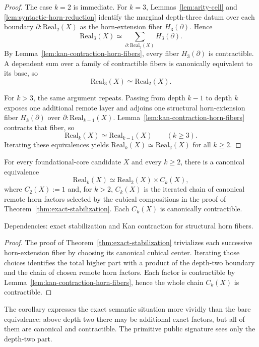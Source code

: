 \documentclass{lmcs}
\begin{document}
\begin{proof}
The case \(k=2\) is immediate.  For \(k=3\), Lemmas~\ref{lem:arity-cell} and
\ref{lem:syntactic-horn-reduction} identify the marginal depth-three datum over each
boundary \(\partial:\mathrm{Real}_2(X)\) as the horn-extension fiber \(H_3(\partial)\).  Hence
\[
  \mathrm{Real}_3(X)
  \simeq
  \sum_{\partial:\mathrm{Real}_2(X)} H_3(\partial).
\]
By Lemma~\ref{lem:kan-contraction-horn-fibers}, every fiber \(H_3(\partial)\) is
contractible.  A dependent sum over a family of contractible fibers is canonically equivalent
to its base, so
\[
  \mathrm{Real}_3(X) \simeq \mathrm{Real}_2(X).
\]

For \(k>3\), the same argument repeats.  Passing from depth \(k-1\) to depth \(k\) exposes
one additional remote layer and adjoins one structural horn-extension fiber \(H_k(\partial)\)
over \(\partial:\mathrm{Real}_{k-1}(X)\).  Lemma~\ref{lem:kan-contraction-horn-fibers}
contracts that fiber, so
\[
  \mathrm{Real}_k(X) \simeq \mathrm{Real}_{k-1}(X)
  \qquad (k\geq 3).
\]
Iterating these equivalences yields \(\mathrm{Real}_k(X)\simeq\mathrm{Real}_2(X)\) for all
\(k\geq 2\).
\end{proof}

\begin{cor}
\label{cor:contractible-factor-decomposition}
For every foundational-core candidate \(X\) and every \(k\geq 2\), there is a canonical
equivalence
\[
  \mathrm{Real}_k(X)
  \simeq
  \mathrm{Real}_2(X) \times C_k(X),
\]
where \(C_2(X):=1\) and, for \(k>2\), \(C_k(X)\) is the iterated chain of canonical remote
horn factors selected by the cubical compositions in the proof of
Theorem~\ref{thm:exact-stabilization}.  Each \(C_k(X)\) is canonically contractible.

Dependencies: exact stabilization and Kan contraction for structural horn fibers.
\end{cor}

\begin{proof}
The proof of Theorem~\ref{thm:exact-stabilization} trivializes each successive horn-extension
fiber by choosing its canonical cubical center.  Iterating those choices identifies the total
higher part with a product of the depth-two boundary and the chain of chosen remote horn
factors.  Each factor is contractible by Lemma~\ref{lem:kan-contraction-horn-fibers}, hence
the whole chain \(C_k(X)\) is contractible.
\end{proof}

The corollary expresses the exact semantic situation more vividly than the bare equivalence:
above depth two there may be additional exact factors, but all of them are canonical and
contractible.  The primitive public signature sees only the depth-two part.
\end{document}
